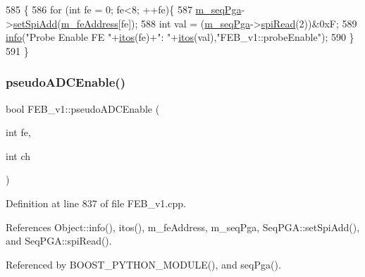 \begin{DoxyCode}
585                         \{
586   \textcolor{keywordflow}{for} (\textcolor{keywordtype}{int} fe = 0; fe<8; ++fe)\{
587     \hyperlink{classFEB__v1_a6c7804ac86796f233a8393043adf2e77}{m\_seqPga}->\hyperlink{classSeqPGA_ac998ce3a6d9b5f2e88cc8393f8c1df53}{setSpiAdd}(\hyperlink{classFEB__v1_a4e1945c2d5b434125f375e9d0fc6d99f}{m\_feAddress}[fe]);
588     \textcolor{keywordtype}{int} val = (\hyperlink{classFEB__v1_a6c7804ac86796f233a8393043adf2e77}{m\_seqPga}->\hyperlink{classSeqPGA_ab3d0e5e5d4014bc7a92588a76b8713d4}{spiRead}(2))&0xF;
589     \hyperlink{classObject_a644fd329ea4cb85f54fa6846484b84a8}{info}(\textcolor{stringliteral}{"Probe Enable FE "}+\hyperlink{Tools_8h_af330027dbdafb9a30768b3613c553e60}{itos}(fe)+\textcolor{stringliteral}{": "}+\hyperlink{Tools_8h_af330027dbdafb9a30768b3613c553e60}{itos}(val),\textcolor{stringliteral}{"FEB\_v1::probeEnable"});
590   \}
591 \}
\end{DoxyCode}
\mbox{\label{classFEB__v1_aeb6c988faf48d93637ef669c54e25223}} 
\subsubsection{\texorpdfstring{pseudo\+A\+D\+C\+Enable()}{pseudoADCEnable()}}
{\footnotesize\ttfamily bool F\+E\+B\+\_\+v1\+::pseudo\+A\+D\+C\+Enable (\begin{DoxyParamCaption}\item[{int}]{fe,  }\item[{int}]{ch }\end{DoxyParamCaption})}



Definition at line 837 of file F\+E\+B\+\_\+v1.\+cpp.



References Object\+::info(), itos(), m\+\_\+fe\+Address, m\+\_\+seq\+Pga, Seq\+P\+G\+A\+::set\+Spi\+Add(), and Seq\+P\+G\+A\+::spi\+Read().



Referenced by B\+O\+O\+S\+T\+\_\+\+P\+Y\+T\+H\+O\+N\+\_\+\+M\+O\+D\+U\+L\+E(), and seq\+Pga().


